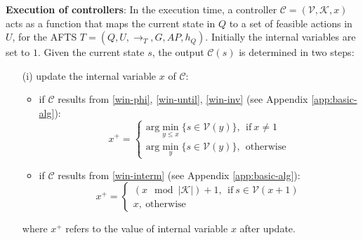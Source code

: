 
\begin{definition} \textbf{Execution of controllers}:
	In the execution time, a controller $ \mathcal{C}=(\mathcal{V},\mathcal{K},x) $ acts as a function that maps the current state in $ Q $ to a set of feasible actions in $ U $, for the AFTS $ T = (Q,U,\rightarrow_T, G,AP,h_Q)$. Initially the internal variables are set to $ 1 $. Given the current state $ s $, the output $ \mathcal{C}(s) $ is determined in two steps:
	\begin{itemize}
		\item[(i)] update the internal variable $ x $ of $ \mathcal{C} $: 
		\begin{itemize}
			\item 	if $ \mathcal{C} $ results from \eqref{win-phi}, \eqref{win-until}, \eqref{win-inv} (see Appendix \ref{app:basic-alg}):
			\begin{displaymath}
			x^+ =	\begin{cases}
			\text{arg}\min_{y\leq x}\{s\in \mathcal{V}(y)\},\ \ \text{if}\ x\not=1\\
			\text{arg}\min_{y}\{s\in \mathcal{V}(y)\},\ \ \text{otherwise}
			\end{cases}
			\end{displaymath}
			\item  if $ \mathcal{C} $ results from \eqref{win-interm} (see Appendix \ref{app:basic-alg}): 
			\begin{displaymath}
			x^+ = \begin{cases}
			(x\mod\vert\mathcal{K}\vert) + 1,\ \ \text{if}\ s\in \mathcal{V}(x+1)\\
			x,\ \text{otherwise}
			\end{cases}
			\end{displaymath}
		\end{itemize}
		where $ x^+ $ refers to the value of internal variable $ x $ after update.
		

\end{itemize}
\end{definition}

